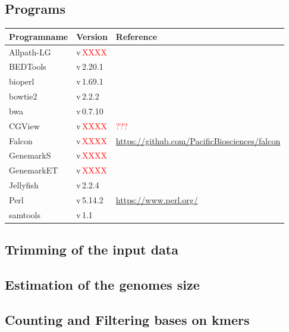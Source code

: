 \documentclass[12pt,a4paper]{scrartcl}
\begin{document}
\subsection*{Programs}

\begin{tabularx}{\linewidth}{llX}\toprule
Programname & Version & Reference \\ \midrule
Allpath-LG  & v\,\textcolor{red}{XXXX} & \textcite{Gnerre2011, Ribeiro2012} \\
BEDTools    & v\,2.20.1 & \textcite{Quinlan2010} \\
bioperl     & v\,1.69.1 & \textcite{Stajich2002} \\
bowtie2     & v\,2.2.2 & \textcite{Langmead2012} \\
bwa         & v\,0.7.10 & \textcite{Li2009a,Li2010} \\
CGView      & v\,\textcolor{red}{XXXX} & \textcite{Grin2011} \textcolor{red}{???} \\
Falcon      & v\,\textcolor{red}{XXXX} & \url{https://github.com/PacificBiosciences/falcon} \\
GenemarkS   & v\,\textcolor{red}{XXXX} & \textcite{Besemer2001} \\
GenemarkET  & v\,\textcolor{red}{XXXX} & \textcite{Lomsadze2014} \\
Jellyfish   & v\,2.2.4  & \textcite{Marcais2011} \\
Perl        & v\,5.14.2  & \url{https://www.perl.org/} \\
samtools    & v\,1.1 & \textcite{Li2009b, Li2011a, Li2011b} \\
\end{tabularx}

\subsection*{Trimming of the input data}

\subsection*{Estimation of the genomes size}

\subsection*{Counting and Filtering bases on kmers}
\end{document}
